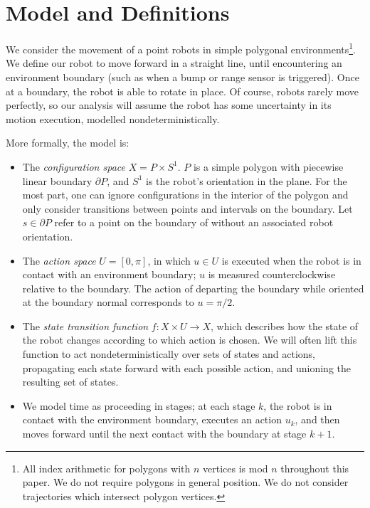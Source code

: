 \documentclass[]{styles/svproc}  %
\begin{document}
\section{Model and Definitions}

We consider the movement of a point robots in simple 
polygonal environments\footnote{All index arithmetic for polygons with $n$ vertices is mod $n$ 
throughout this paper. We do not require polygons in general position. We do
not consider trajectories which intersect polygon vertices.}. We define our robot to move forward in a straight line, until
encountering an environment boundary (such as when a bump or range sensor is
triggered). Once at a boundary, the robot is able to rotate in place.
Of course, robots rarely move perfectly, so our analysis will assume the
robot has some uncertainty in its motion execution, modelled
nondeterministically.

More formally, the model is:
\begin{itemize}
\item The \emph{configuration space} $X = P \times S^1$. $P$ is a simple polygon with 
piecewise linear boundary $\partial P$, and $S^1$ is the robot's orientation in the plane. For the most part, one can ignore configurations in the interior
of the polygon and only consider transitions between points and intervals on the
boundary. Let $s \in \partial P$ refer to a point on
the boundary of without an associated robot orientation.
\item The \emph{action space} $U = [0,\pi]$, in which $u \in U$ is executed when
the robot is in contact with an environment boundary; $u$ is measured counterclockwise
relative to the boundary. The action of departing the boundary while oriented at the boundary
normal corresponds to $u = \pi/2$.
\item The \emph{state transition function} $f: X \times U \to X$, which
describes how the state of the robot changes according to which action is
chosen. We will often lift this function to act nondeterministically over sets
of states and actions, propagating each state forward with each possible action,
and unioning the resulting set of states. 
\item We model time as proceeding in stages; at each stage $k$, the robot
is in contact with the environment boundary, executes an action $u_k$, and then
moves forward until the next contact with the boundary at stage $k+1$.
\end{itemize}
\end{document}
